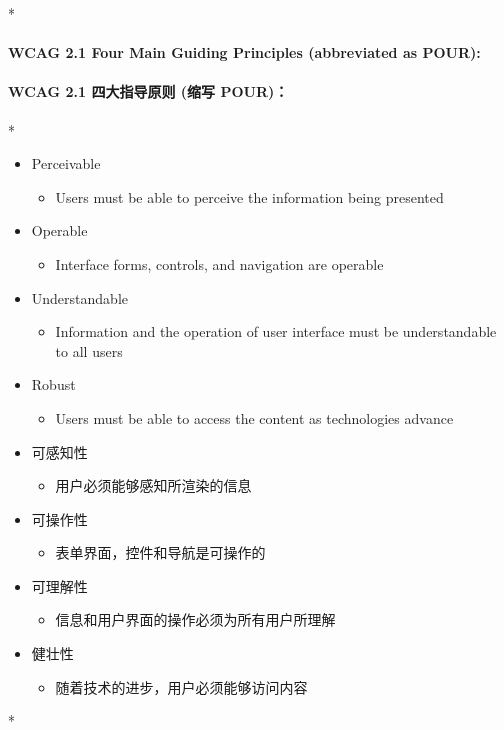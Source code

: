 \begin{paracol}{2} 
 
\switchcolumn[0]*%
\paragraph{WCAG 2.1 Four Main Guiding Principles (abbreviated as POUR):}
\switchcolumn
\paragraph{WCAG 2.1 四大指导原则 (缩写 POUR)：}
\switchcolumn[0]*%
\begin{itemize}
\item
  Perceivable
  \begin{itemize}
  \item
    Users must be able to perceive the information being presented
  \end{itemize}
\item
  Operable
  \begin{itemize}
  \item
    Interface forms, controls, and navigation are operable
  \end{itemize}
\item
  Understandable
  \begin{itemize}
  \item
    Information and the operation of user interface must be
    understandable to all users
  \end{itemize}
\item
  Robust
  \begin{itemize}
  \item
    Users must be able to access the content as technologies advance
  \end{itemize}
\end{itemize}
\switchcolumn
\begin{itemize}
\item
  可感知性
  \begin{itemize}
  \item
    用户必须能够感知所渲染的信息
  \end{itemize}
\item
  可操作性
  \begin{itemize}
  \item
    表单界面，控件和导航是可操作的
  \end{itemize}
\item
  可理解性
  \begin{itemize}
  \item
    信息和用户界面的操作必须为所有用户所理解
  \end{itemize}
\item
  健壮性
  \begin{itemize}
  \item
    随着技术的进步，用户必须能够访问内容
  \end{itemize}
\end{itemize}
\switchcolumn[0]*%

\end{paracol}
